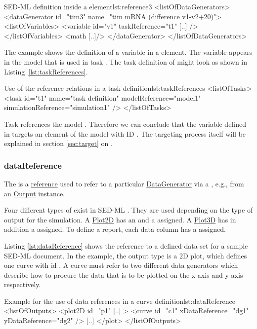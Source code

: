 \begin{myXmlLst}{SED-ML  definition inside a  element}{lst:reference3}
<listOfDataGenerators>
	<dataGenerator id="tim3" name="tim mRNA (difference v1-v2+20)">
	<listOfVariables>
   		<variable id="v1" taskReference="t1" [..] />
  	</listOfVariables>
  	<math [..]/>
	</dataGenerator>
</listOfDataGenerators>
\end{myXmlLst}

The example shows the definition of a variable  in a  element. The variable appears in the model that is used in task . The task definition of  might look as shown in Listing~\ref{lst:taskReferences}.

\begin{myXmlLst}{Use of the reference relations in a task definition}{lst:taskReferences}
<listOfTasks>
	<task id="t1" name="task definition" modelReference="model1" simulationReference="simulation1" />
</listOfTasks>
\end{myXmlLst}
Task  references the model . Therefore we can conclude that the variable  defined in  targets an element of the model with ID . The targeting process itself will be explained in section \ref{sec:target} on .


\subsubsection{dataReference}
\label{sec:dataReference}
The  is a \hyperref[sec:reference]{reference} used to refer to a particular \hyperref[class:dataGenerator]{DataGenerator}
via a \hyperref[type:sidref]{}, e.g., from an \hyperref[class:output]{Output} instance.

Four different types of  exist in SED-ML \currentLV. They are used depending on the type of output for the simulation. A \hyperref[class:plot2D]{Plot2D} has an \hyperref[sec:xDataReference]{} and a \hyperref[sec:yDataReference]{} assigned. A \hyperref[class:plot3D]{Plot3D} has in addition a \hyperref[sec:zDataReference]{} assigned. To define a report, each data column has a \hyperref[sec:dataReference1]{} assigned.

Listing \ref{lst:dataReference} shows the reference to a defined data set for a sample SED-ML document. In the example, the output type is a 2D plot, which defines one curve with id . A curve must refer to two different data generators which describe how to procure the data that is to be plotted on the x-axis and y-axis respectively. 

\begin{myXmlLst}{Example for the use of data references in a curve definition}{lst:dataReference}
<listOfOutputs>
	<plot2D id="p1" [..] >
    		<curve id="c1" xDataReference="dg1" yDataReference="dg2" />
		[..]
	</plot>
</listOfOutputs>
\end{myXmlLst}
